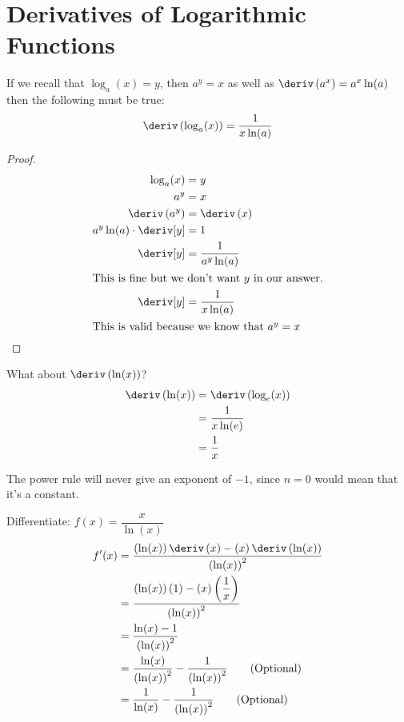 
\section{Derivatives of Logarithmic Functions}
\begin{theorem}
    If we recall that $\log_a(x) = y$, then $a^y = x$ as well as $\deriv\left(a^x\right) = a^x \ln(a)$ then the following must be true:
    \begin{equation}
        \deriv \left(\log_a(x)\right) = \dfrac{1}{x\ln(a)}
    \end{equation}
\end{theorem}
\begin{proof}
    \begin{align*}
        \log_a(x) &= y \\
        a^y &= x \\
        \deriv \left(a^y\right)    &= \deriv \left(x\right)\\
        a^y \ln(a) \cdot \deriv[y] &= 1 \\
        \deriv[y]                  &= \dfrac{1}{a^y \ln(a)} \\
        \intertext{This is fine but we don't want $y$ in our answer.}
        \deriv[y]                  &= \dfrac{1}{x \ln(a)} \\
        \intertext{This is valid because we know that $a^y = x$}
    \end{align*}
\end{proof}
What about $\deriv\left(\ln(x)\right)$?
\begin{align*}
    \deriv\left(\ln(x)\right) &= \deriv \left(\log_e(x)\right) \\
                              &= \dfrac{1}{x\ln(e)} \\
                              &= \dfrac{1}{x}
\end{align*}
\begin{note}
    The power rule will never give an exponent of $-1$, since $n = 0$ would mean that it's a constant.
\end{note}
\begin{example}
    Differentiate: $f(x) = \dfrac{x}{\ln(x)}$
    \begin{align*}
        f'(x) &= \dfrac{\left(\ln(x)\right)\deriv\left(x\right) - \left(x\right)\deriv\left(\ln(x)\right)}{\left(\ln(x)\right)^2} \\
              &= \dfrac{\left(\ln(x)\right)\left(1\right) - \left(x\right)\left(\dfrac{1}{x}\right)}{\left(\ln(x)\right)^2} \\
              &= \dfrac{\ln(x) - 1}{\left(\ln(x)\right)^2} \\
              &= \dfrac{\ln(x)}{\left(\ln(x)\right)^2} - \dfrac{1}{\left(\ln(x)\right)^2} \tag{Optional} \\
              &= \dfrac{1}{\ln(x)} - \dfrac{1}{\left(\ln(x)\right)^2} \tag{Optional}
    \end{align*}
\end{example}

